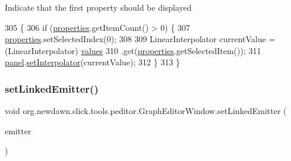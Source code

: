 Indicate that the first property should be displayed 
\begin{DoxyCode}
305                                    \{
306         \textcolor{keywordflow}{if} (\mbox{\hyperlink{classorg_1_1newdawn_1_1slick_1_1tools_1_1peditor_1_1_graph_editor_window_ac9d1313ef13023ef8d250b689e52ff12}{properties}}.getItemCount() > 0) \{
307             \mbox{\hyperlink{classorg_1_1newdawn_1_1slick_1_1tools_1_1peditor_1_1_graph_editor_window_ac9d1313ef13023ef8d250b689e52ff12}{properties}}.setSelectedIndex(0);
308 
309             LinearInterpolator currentValue = (LinearInterpolator) \mbox{\hyperlink{classorg_1_1newdawn_1_1slick_1_1tools_1_1peditor_1_1_graph_editor_window_a14eef550e2a6dd21ddb25d4fdec6945c}{values}}
310                     .\textcolor{keyword}{get}(\mbox{\hyperlink{classorg_1_1newdawn_1_1slick_1_1tools_1_1peditor_1_1_graph_editor_window_ac9d1313ef13023ef8d250b689e52ff12}{properties}}.getSelectedItem());
311             \mbox{\hyperlink{classorg_1_1newdawn_1_1slick_1_1tools_1_1peditor_1_1_graph_editor_window_ac332b313a344ef1a5becf8e6075dc70b}{panel}}.\mbox{\hyperlink{classorg_1_1newdawn_1_1slick_1_1tools_1_1peditor_1_1_graph_editor_window_1_1_graph_panel_a290757906b8a1372930a6d0f29f886da}{setInterpolator}}(currentValue);
312         \}
313     \}
\end{DoxyCode}
\mbox{\label{classorg_1_1newdawn_1_1slick_1_1tools_1_1peditor_1_1_graph_editor_window_a730b1623fd758a872f24f7593f8fbafb}} 
\subsubsection{\texorpdfstring{set\+Linked\+Emitter()}{setLinkedEmitter()}}
{\footnotesize\ttfamily void org.\+newdawn.\+slick.\+tools.\+peditor.\+Graph\+Editor\+Window.\+set\+Linked\+Emitter (\begin{DoxyParamCaption}\item[{\mbox{\hyperlink{classorg_1_1newdawn_1_1slick_1_1particles_1_1_configurable_emitter}{Configurable\+Emitter}}}]{emitter }\end{DoxyParamCaption})\hspace{0.3cm}{\ttfamily [inline]}}

